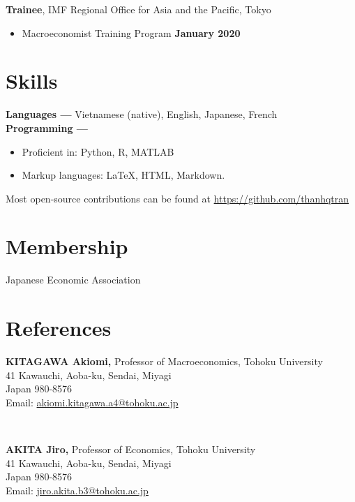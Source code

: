 \documentclass[margin,line]{res}
\begin{document}
\begin{resume}
{\bf Trainee}, IMF Regional Office for Asia and the Pacific, Tokyo
\vspace*{.05in}
\begin{itemize}
\item[ ] Macroeconomist Training Program \hfill {\bf January 2020}
\end{itemize}


\section{\sc Skills}
{\bf Languages ---}
\vspace*{.05in}
Vietnamese (native), English, Japanese, French \\
{\bf Programming ---}
\vspace*{.05in}
\begin{itemize}
	\item Proficient in: Python, R, MATLAB
	\item Markup languages: \LaTeX, HTML, Markdown.
\end{itemize}
Most open-source contributions can be found at \url{https://github.com/thanhqtran}

\section{\sc Membership}
Japanese Economic Association

\newpage




%


\section{\sc References}
\vspace*{.05in}
\parbox{\textwidth}{
{\bf KITAGAWA Akiomi,} Professor of Macroeconomics, Tohoku University \\
41 Kawauchi, Aoba-ku, Sendai, Miyagi \\
Japan 980-8576 \\
Email: \href{mailto:akiomi.kitagawa.a4@tohoku.ac.jp}{akiomi.kitagawa.a4@tohoku.ac.jp}} \\

\par
\parbox{\textwidth}{
{\bf AKITA Jiro,} Professor of Economics, Tohoku University\\
41 Kawauchi, Aoba-ku, Sendai, Miyagi \\
Japan 980-8576 \\
Email: \href{mailto:jiro.akita.b3@tohoku.ac.jp}{jiro.akita.b3@tohoku.ac.jp}}


\end{resume}
\end{document}
